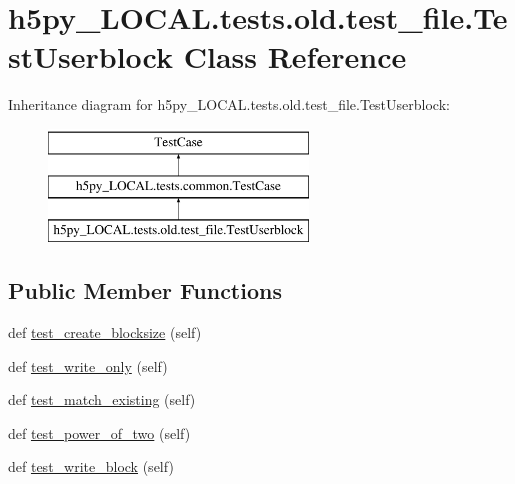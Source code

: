 \hypertarget{classh5py__LOCAL_1_1tests_1_1old_1_1test__file_1_1TestUserblock}{}\section{h5py\+\_\+\+L\+O\+C\+A\+L.\+tests.\+old.\+test\+\_\+file.\+Test\+Userblock Class Reference}
\label{classh5py__LOCAL_1_1tests_1_1old_1_1test__file_1_1TestUserblock}
Inheritance diagram for h5py\+\_\+\+L\+O\+C\+A\+L.\+tests.\+old.\+test\+\_\+file.\+Test\+Userblock\+:\begin{figure}[H]
\begin{center}
\leavevmode
\includegraphics[height=3.000000cm]{classh5py__LOCAL_1_1tests_1_1old_1_1test__file_1_1TestUserblock}
\end{center}
\end{figure}
\subsection*{Public Member Functions}
\begin{DoxyCompactItemize}
\item 
def \hyperlink{classh5py__LOCAL_1_1tests_1_1old_1_1test__file_1_1TestUserblock_ad3e61030e39c088f72d9a080715a8048}{test\+\_\+create\+\_\+blocksize} (self)
\item 
def \hyperlink{classh5py__LOCAL_1_1tests_1_1old_1_1test__file_1_1TestUserblock_a7b5af153f0ba69793fc1060defc6c904}{test\+\_\+write\+\_\+only} (self)
\item 
def \hyperlink{classh5py__LOCAL_1_1tests_1_1old_1_1test__file_1_1TestUserblock_a83feb552821a8a058a70f360ec79117d}{test\+\_\+match\+\_\+existing} (self)
\item 
def \hyperlink{classh5py__LOCAL_1_1tests_1_1old_1_1test__file_1_1TestUserblock_a8c8181db38ec5f3d72a90de972b673ce}{test\+\_\+power\+\_\+of\+\_\+two} (self)
\item 
def \hyperlink{classh5py__LOCAL_1_1tests_1_1old_1_1test__file_1_1TestUserblock_a166cd50ad355ae4cfd03e872ce88bba7}{test\+\_\+write\+\_\+block} (self)
\end{DoxyCompactItemize}
